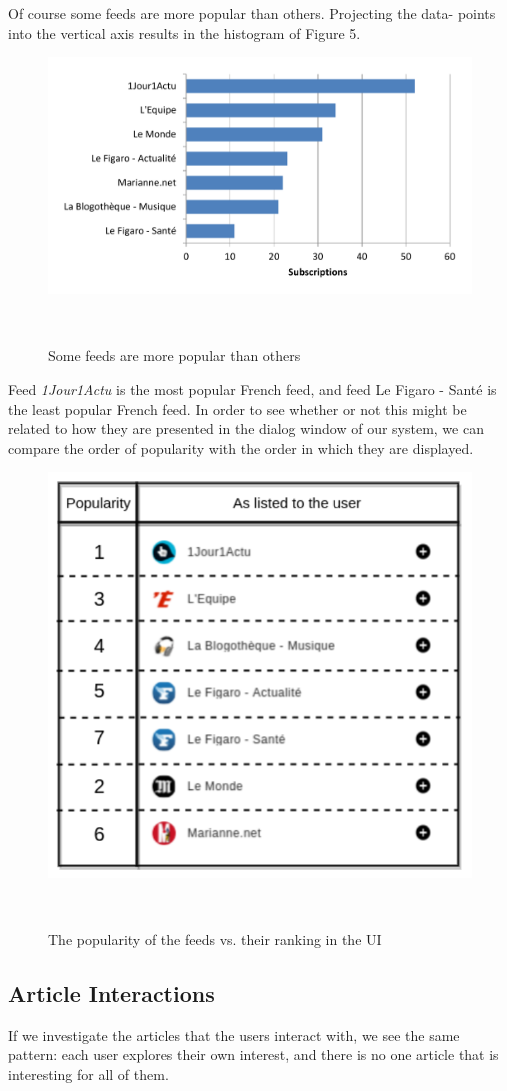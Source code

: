 Of course some feeds are more popular than others. Projecting the data- points into the vertical axis results in the histogram of Figure 5.

\begin{figure}[h!]
\centering
  \includegraphics[width=\columnwidth]{figures/feed_popularity}
  \caption{Some feeds are more popular than others}~\label{fig:registrations}
\end{figure}


Feed {\em 1Jour1Actu} is the most popular French feed, and feed Le Figaro - Sant\'e is the least popular French feed. In order to see whether or not this might be related to how they are presented in the dialog window of our system, we can compare the order of popularity with the order in which they are displayed.

\begin{figure}[h!]
\centering
  \includegraphics[width=0.5\columnwidth]{figures/feed_popularity_vs_ranking}
  \caption{The popularity of the feeds vs. their ranking in the UI}~\label{fig:registrations}
\end{figure}


\subsection{Article Interactions}
If we investigate the articles that the users interact with, we see the same pattern: each user explores their own interest, and there is no one article that is interesting for all of them. 

